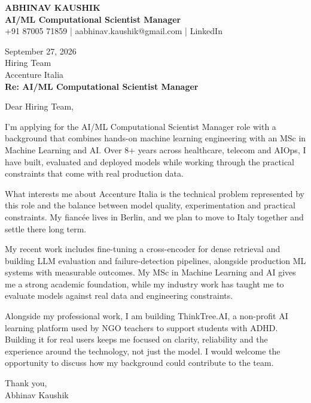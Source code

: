 \documentclass[10pt,a4paper]{article}
\begin{document}
\begin{center}
{\Large\bfseries ABHINAV KAUSHIK}\\[2pt]
{\bfseries AI/ML Computational Scientist Manager}\\[2pt]
+91 87005 71859 \quad | \quad aabhinav.kaushik@gmail.com \quad | \quad LinkedIn
\end{center}
\vspace{8pt}
September 27, 2026\\[6pt]
Hiring Team\\
Accenture Italia\\[4pt]
\textbf{Re: AI/ML Computational Scientist Manager}

Dear Hiring Team,

I’m applying for the AI/ML Computational Scientist Manager role with a background that combines hands-on machine learning engineering with an MSc in Machine Learning and AI. Over 8+ years across healthcare, telecom and AIOps, I have built, evaluated and deployed models while working through the practical constraints that come with real production data.

What interests me about Accenture Italia is the technical problem represented by this role and the balance between model quality, experimentation and practical constraints. My fiancée lives in Berlin, and we plan to move to Italy together and settle there long term.

My recent work includes fine-tuning a cross-encoder for dense retrieval and building LLM evaluation and failure-detection pipelines, alongside production ML systems with measurable outcomes. My MSc in Machine Learning and AI gives me a strong academic foundation, while my industry work has taught me to evaluate models against real data and engineering constraints.

Alongside my professional work, I am building ThinkTree.AI, a non-profit AI learning platform used by NGO teachers to support students with ADHD. Building it for real users keeps me focused on clarity, reliability and the experience around the technology, not just the model. I would welcome the opportunity to discuss how my background could contribute to the team.

Thank you,\\
Abhinav Kaushik
\end{document}
